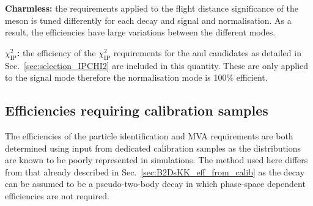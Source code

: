 \begin{description}
\item \textbf{Charmless:} the requirements applied to the flight distance significance of the \Dsp meson is tuned differently for each \Dsp decay and signal and normalisation. As a result, the efficiencies have large variations between the different modes.

\item \textbf{$\chi^{2}_{\text{IP}}$:} the efficiency of the $\chi^{2}_{\text{IP}}$ requirements for the \Bp and \Dsp candidates as detailed in Sec.~\ref{sec:selection_IPCHI2} are included in this quantity. These are only applied to the signal mode therefore the normalisation mode is 100\% efficient.

\end{description}





\subsection{Efficiencies requiring calibration samples}

The efficiencies of the particle identification and MVA requirements are both determined using input from dedicated calibration samples as the distributions are known to be poorly represented in simulations. The method used here differs from that already described in Sec.~\ref{sec:B2DsKK_eff_from_calib} as the \decay{\Bp}{\Dsp\phiz} decay can be assumed to be a pseudo-two-body decay in which phase-space dependent efficiencies are not required. 

